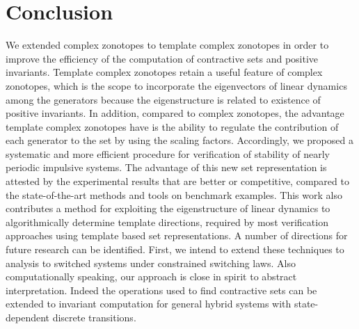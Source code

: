 \vspace{0em}
\section{Conclusion}
We extended complex zonotopes to template complex zonotopes in order
to improve the efficiency of the computation of contractive sets and
positive invariants.  Template complex zonotopes retain a useful
feature of complex zonotopes, which is the scope to incorporate the
eigenvectors of linear dynamics among the generators because the
eigenstructure is related to existence of positive invariants.  In
addition, compared to complex zonotopes, the advantage template
complex zonotopes have is the ability to regulate the contribution of
each generator to the set by using the scaling factors.  Accordingly,
we proposed a systematic and more efficient procedure for verification
of stability of nearly periodic impulsive systems.  The advantage of
this new set representation is attested by the experimental results
that are better or competitive, compared to the state-of-the-art
methods and tools on benchmark examples. This work also contributes a
method for exploiting the eigenstructure of linear dynamics to
algorithmically determine template directions, required by most
verification approaches using template based set representations.  A
number of directions for future research can be identified. First, we
intend to extend these techniques to analysis to switched systems
under constrained switching laws. Also computationally speaking, our
approach is close in spirit to abstract interpretation. Indeed the
operations used to find contractive sets can be extended to invariant
computation for general hybrid systems with state-dependent discrete
transitions.

